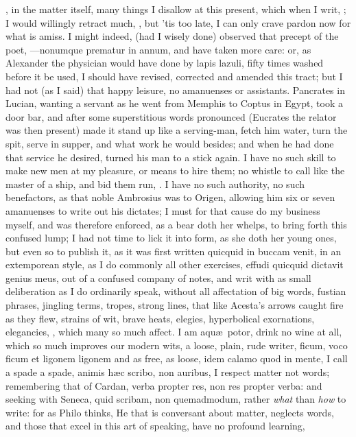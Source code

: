 {, in the matter itself, many things I disallow at
this present, which when I writ, ; I
would willingly retract much, \etc, but 'tis too late, I can only crave
pardon now for what is amiss. I might indeed, (had I wisely done)
observed that precept of the poet, ---nonumque prematur in annum, and
have taken more care: or, as Alexander the physician would have done by
lapis lazuli, fifty times washed before it be used, I should have
revised, corrected and amended this tract; but I had not (as I said)
that happy leisure, no amanuenses or assistants. Pancrates in
Lucian, wanting a servant as he went from Memphis to Coptus in
Egypt, took a door bar, and after some superstitious words pronounced
(Eucrates the relator was then present) made it stand up like a
serving-man, fetch him water, turn the spit, serve in supper, and what
work he would besides; and when he had done that service he desired,
turned his man to a stick again. I have no such skill to make new men
at my pleasure, or means to hire them; no whistle to call like the
master of a ship, and bid them run, \etc. I have no such authority, no
such benefactors, as that noble Ambrosius was to Origen, allowing
him six or seven amanuenses to write out his dictates; I must for that
cause do my business myself, and was therefore enforced, as a bear doth
her whelps, to bring forth this confused lump; I had not time to lick
it into form, as she doth her young ones, but even so to publish it, as
it was first written quicquid in buccam venit, in an extemporean style,
as I do commonly all other exercises, effudi quicquid dictavit
genius meus, out of a confused company of notes, and writ with as small
deliberation as I do ordinarily speak, without all affectation of big
words, fustian phrases, jingling terms, tropes, strong lines, that like
Acesta's arrows caught fire as they flew, strains of wit, brave
heats, elegies, hyperbolical exornations, elegancies, \etc, which many
so much affect. I am aqu\ae{}\ potor, drink no wine at all, which so
much improves our modern wits, a loose, plain, rude writer, ficum, voco
ficum et ligonem ligonem and as free, as loose, idem calamo quod in
mente, I call a spade a spade, animis h\ae{}c scribo, non auribus, I
respect matter not words; remembering that of Cardan, verba propter
res, non res propter verba: and seeking with Seneca, quid scribam, non
quemadmodum, rather \emph{what} than \emph{how} to write: for as Philo thinks,
He that is conversant about matter, neglects words, and those that
excel in this art of speaking, have no profound learning,

}

